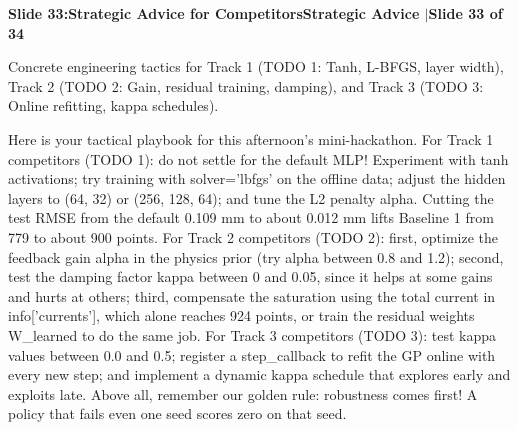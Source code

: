 \documentclass[11pt,a4paper]{article}
\begin{document}
\noindent\begin{tcolorbox}[colback=navy,colframe=navy,left=6pt,right=6pt,top=3pt,bottom=3pt,boxrule=0pt,arc=2pt]
{\large\bfseries\color{white}Slide 33:\enspace Strategic Advice for Competitors}\hfill{\footnotesize\bfseries\color{white!85!lightbg}Strategic Advice \enspace$|$\enspace Slide 33 of 34}
\end{tcolorbox}
\vspace{0.2em}
\begin{tcolorbox}[colback=lightbg,colframe=bordergray,title={\footnotesize\bfseries\color{darkgray}Slide Visual Blueprint},fontupper=\small,left=6pt,right=6pt,top=2.5pt,bottom=2.5pt,boxrule=0.6pt,arc=2.5pt]
Concrete engineering tactics for Track 1 (TODO 1: Tanh, L-BFGS, layer width), Track 2 (TODO 2: Gain, residual training, damping), and Track 3 (TODO 3: Online refitting, kappa schedules).
\end{tcolorbox}
\vspace{0.2em}
\begin{tcolorbox}[colback=white,colframe=primaryblue,title={\footnotesize\bfseries\color{white}Spoken Presenter Script},fontupper=\small,left=6pt,right=6pt,top=3pt,bottom=3pt,boxrule=0.8pt,arc=2.5pt]
Here is your tactical playbook for this afternoon's mini-hackathon. For Track 1 competitors (TODO 1): do not settle for the default MLP! Experiment with tanh activations; try training with solver='lbfgs' on the offline data; adjust the hidden layers to (64, 32) or (256, 128, 64); and tune the L2 penalty alpha. Cutting the test RMSE from the default 0.109 mm to about 0.012 mm lifts Baseline 1 from 779 to about 900 points. For Track 2 competitors (TODO 2): first, optimize the feedback gain alpha in the physics prior (try alpha between 0.8 and 1.2); second, test the damping factor kappa between 0 and 0.05, since it helps at some gains and hurts at others; third, compensate the saturation using the total current in info['currents'], which alone reaches 924 points, or train the residual weights W\_learned to do the same job. For Track 3 competitors (TODO 3): test kappa values between 0.0 and 0.5; register a step\_callback to refit the GP online with every new step; and implement a dynamic kappa schedule that explores early and exploits late. Above all, remember our golden rule: robustness comes first! A policy that fails even one seed scores zero on that seed.
\end{tcolorbox}
\vspace{0.2em}
\end{document}
